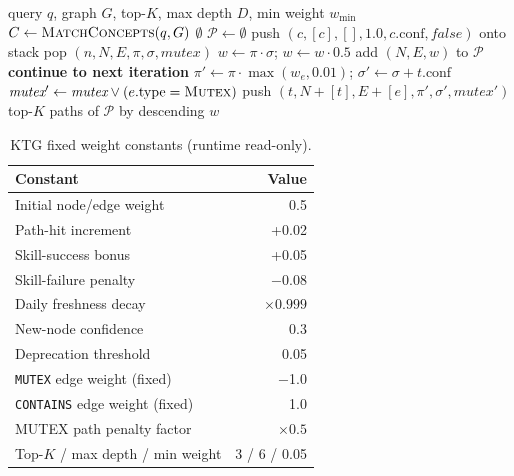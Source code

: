 \documentclass[sigconf]{acmart}
\newcommand{\CONTINUE}{\STATE \textbf{continue to next iteration}}
\begin{document}
\begin{algorithm}[t]
\caption{KTG Weight-Driven Path Search}\label{alg:ktg}
\begin{algorithmic}[1]
\REQUIRE query $q$, graph $G$, top-$K$, max depth $D$, min weight $w_{\min}$
\STATE $C \gets \textsc{MatchConcepts}(q, G)$ 
 \RETURN $\emptyset$  \ENDIF
\STATE $\mathcal{P} \gets \emptyset$
  \STATE push $(c, [c], [], 1.0, c.\text{conf}, \textit{false})$ onto stack
    \STATE pop $(n, N, E, \pi, \sigma, \textit{mutex})$
        \STATE $w \gets \pi \cdot \sigma$;  $w \gets w \cdot 0.5$ \ENDIF
         add $(N,E,w)$ to $\mathcal{P}$ \ENDIF
      \ENDIF
      \CONTINUE
    \ENDIF
      \STATE $\pi' \gets \pi \cdot \max(w_e, 0.01)$; $\sigma' \gets \sigma + t.\text{conf}$
      \STATE $\textit{mutex}' \gets \textit{mutex} \lor (e.\text{type}=\textsc{Mutex})$
       push $(t, N{+}[t], E{+}[e], \pi', \sigma', \textit{mutex}')$ \ENDIF
    \ENDFOR
  \ENDWHILE
\ENDFOR
\RETURN top-$K$ paths of $\mathcal{P}$ by descending $w$
\end{algorithmic}
\end{algorithm}

\begin{table}[t]
  \small
  \caption{KTG fixed weight constants (runtime read-only).}
  \label{tab:weights}
  \begin{tabular}{lr}
    \toprule
    Constant & Value \\
    \midrule
    Initial node/edge weight & 0.5 \\
    Path-hit increment & +0.02 \\
    Skill-success bonus & +0.05 \\
    Skill-failure penalty & $-$0.08 \\
    Daily freshness decay & $\times 0.999$ \\
    New-node confidence & 0.3 \\
    Deprecation threshold & 0.05 \\
    \texttt{MUTEX} edge weight (fixed) & $-$1.0 \\
    \texttt{CONTAINS} edge weight (fixed) & 1.0 \\
    MUTEX path penalty factor & $\times 0.5$ \\
    Top-$K$ / max depth / min weight & 3 / 6 / 0.05 \\
    \bottomrule
  \end{tabular}
\end{table}
\end{document}
